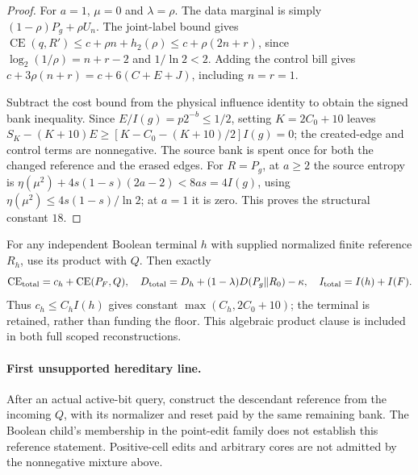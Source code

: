 \documentclass[11pt]{article}
\begin{document}
\begin{proof}
For $a=1$, $\mu=0$ and $\lambda=\rho$. The data marginal is simply
$(1-\rho)P_g+\rho U_n$. The joint-label bound gives
$\operatorname{CE}(q,R')\le c+\rho n+h_2(\rho)
\le c+\rho(2n+r)$, since $\log_2(1/\rho)=n+r-2$ and
$1/\ln2<2$. Adding the control bill gives
$c+3\rho(n+r)=c+6(C+E+J)$, including $n=r=1$.

Subtract the cost bound from the physical influence identity to obtain
the signed bank inequality. Since $E/I(g)=p2^{-b}\le1/2$, setting
$K=2C_0+10$ leaves
$S_K-(K+10)E\ge[K-C_0-(K+10)/2]I(g)=0$;
the created-edge and control terms are nonnegative. The source bank is
spent once for both the changed reference and the erased edges.
For $R=P_g$, at $a\ge2$ the source entropy is
$\eta(\mu^2)+4s(1-s)(2a-2)<8as=4I(g)$, using
$\eta(\mu^2)\le4s(1-s)/\ln2$; at $a=1$ it is zero.
This proves the structural constant $18$.
\end{proof}

For any independent Boolean terminal $h$ with supplied normalized finite
reference $R_h$, use its product with $Q$. Then exactly
\[
 \operatorname{CE}_{\rm total}=c_h+\operatorname{CE}(P_F,Q),\quad
 D_{\rm total}=D_h+(1-\lambda)D(P_g\Vert R_0)-\kappa,
 \quad I_{\rm total}=I(h)+I(F).
\]
Thus $c_h\le C_hI(h)$ gives constant $\max(C_h,2C_0+10)$;
the terminal is retained, rather than funding the floor. This algebraic
product clause is included in both full scoped reconstructions.

\paragraph{First unsupported hereditary line.}
After an actual active-bit query, construct the descendant reference
from the incoming $Q$, with its normalizer and reset paid by the same
remaining bank. The Boolean child's membership in the point-edit family
does not establish this reference statement. Positive-cell edits and
arbitrary cores are not admitted by the nonnegative mixture above.
\end{document}
